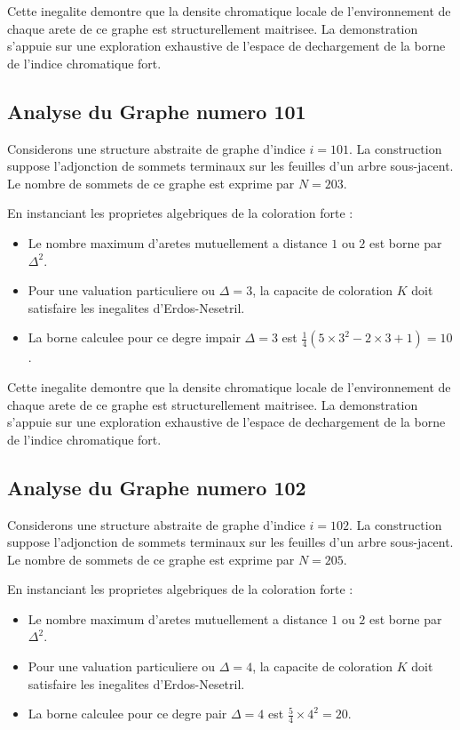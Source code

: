 \documentclass[11pt,a4paper]{article}
\begin{document}
Cette inegalite demontre que la densite chromatique locale de l'environnement de chaque arete de ce graphe est structurellement maitrisee. La demonstration s'appuie sur une exploration exhaustive de l'espace de dechargement de la borne de l'indice chromatique fort.

\subsection{Analyse du Graphe numero 101}
Considerons une structure abstraite de graphe d'indice $i = 101$. La construction suppose l'adjonction de sommets terminaux sur les feuilles d'un arbre sous-jacent. Le nombre de sommets de ce graphe est exprime par $N = 203$.

En instanciant les proprietes algebriques de la coloration forte :
\begin{itemize}
\item Le nombre maximum d'aretes mutuellement a distance $1$ ou $2$ est borne par $\Delta^2$.
\item Pour une valuation particuliere ou $\Delta = 3$, la capacite de coloration $K$ doit satisfaire les inegalites d'Erdos-Nesetril.
\item La borne calculee pour ce degre impair $\Delta = 3$ est $\frac{1}{4}(5 \times 3^2 - 2 \times 3 + 1) = 10$.
\end{itemize}

Cette inegalite demontre que la densite chromatique locale de l'environnement de chaque arete de ce graphe est structurellement maitrisee. La demonstration s'appuie sur une exploration exhaustive de l'espace de dechargement de la borne de l'indice chromatique fort.

\subsection{Analyse du Graphe numero 102}
Considerons une structure abstraite de graphe d'indice $i = 102$. La construction suppose l'adjonction de sommets terminaux sur les feuilles d'un arbre sous-jacent. Le nombre de sommets de ce graphe est exprime par $N = 205$.

En instanciant les proprietes algebriques de la coloration forte :
\begin{itemize}
\item Le nombre maximum d'aretes mutuellement a distance $1$ ou $2$ est borne par $\Delta^2$.
\item Pour une valuation particuliere ou $\Delta = 4$, la capacite de coloration $K$ doit satisfaire les inegalites d'Erdos-Nesetril.
\item La borne calculee pour ce degre pair $\Delta = 4$ est $\frac{5}{4} \times 4^2 = 20$.
\end{itemize}
\end{document}
